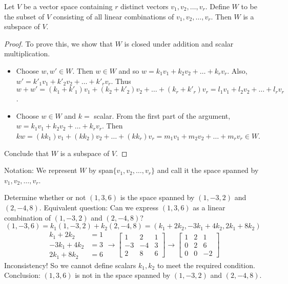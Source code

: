 \documentclass[12pt]{article}
\begin{document}
\begin{theorem} Let $V$ be a vector space containing $r$ distinct vectors $v_1, v_2, \dots, v_r$. Define $W$ to be the subset of $V$ consisting of all linear combinations of $v_1, v_2, \dots, v_r$. Then $W$ is a subspace of $V$. \end{theorem} 
\begin{proof} To prove this, we show that $W$ is closed under addition and scalar multiplication. \begin{itemize} \item Choose $w, w' \in W$. Then $w \in W$ and so $w = k_1v_1 + k_2v_2 + \dots + k_rv_r$. Also, $w' = k'_1v_1 + k'_2v_2 + \dots + k'_rv_r$. Thus $ w + w' = (k_1 + k'_1)v_1 + (k_2 + k'_2)v_2 + \dots + (k_r + k'_r)v_r = l_1v_1 + l_2v_2 + \dots + l_rv_r $. \item Choose $w \in W$ and $k = $ scalar. From the first part of the argument, $ w = k_1v_1 + k_2v_2 + \dots + k_rv_r$. Then $kw = (kk_1)v_1 + (kk_2)v_2 + \dots + (kk_r)v_r = m_1v_1 + m_2v_2 + \dots + m_rv_r \in W$. \end{itemize} Conclude that $W$ is a subspace of $V$. \end{proof} 
Notation: We represent $W$ by span$\{v_1, v_2, \dots, v_r\}$ and call it the space spanned by $v_1, v_2, \dots, v_r$. 
\begin{example} Determine whether or not $(1, 3, 6)$ is the space spanned by $(1, -3, 2)$ and $(2, -4, 8)$. Equivalent question: Can we express $(1, 3, 6)$ as a linear combination of $(1, -3, 2)$ and $(2, -4, 8)$? $$ (1, -3, 6) = k_1(1, -3, 2) + k_2(2, -4, 8) = (k_1 + 2k_2, -3k_1 + 4k_2, 2k_1 + 8k_2) $$ $$ \begin{aligned} k_1 + 2k_2 &= 1 \\ -3k_1 + 4k_2 &= 3 \\ 2k_1 + 8k_2 &= 6 \end{aligned} \rightarrow \begin{bmatrix} 1 & 2 & 1 \\ -3 & -4 & 3 \\ 2 & 8 & 6 \end{bmatrix} \rightarrow \begin{bmatrix} 1 & 2 & 1 \\ 0 & 2 & 6 \\ 0 & 0 & -2 \end{bmatrix} $$ Inconsistency! So we cannot define scalars $k_1, k_2$ to meet the required condition. \newline Conclusion: $(1, 3, 6)$ is not in the space spanned by $(1, -3, 2)$ and $(2, -4, 8)$. \end{example} 
\end{document}
